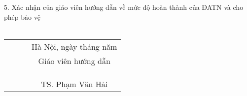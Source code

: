 \begin{acknowledgementslong}
5. Xác nhận của giáo viên hướng dẫn về mức độ hoàn thành của ĐATN và cho phép bảo vệ \\\\[5cm]
\begin{tabular}{l l l c }
    \textbf{ } \hspace*{35pt} \textbf{ } &  \textbf{ } \hspace*{35pt} \textbf{ } & \textbf{ } \hspace*{35pt} \textbf{ } & Hà Nội, ngày \textbf{  } tháng \textbf{  } năm \textbf{   } \\ 
    \textbf{ } \hspace*{35pt} \textbf{ } &  \textbf{ } \hspace*{35pt} \textbf{ } & \textbf{ } \hspace*{35pt} \textbf{ } & Giáo viên hướng dẫn \\
    \\
    \\
    \\
    \textbf{ } \hspace*{35pt} \textbf{ } &  \textbf{ } \hspace*{35pt} \textbf{ } & \textbf{ } \hspace*{35pt} \textbf{ } & TS. Phạm Văn Hải
    \end{tabular}\\
    
\end{acknowledgementslong}
  
